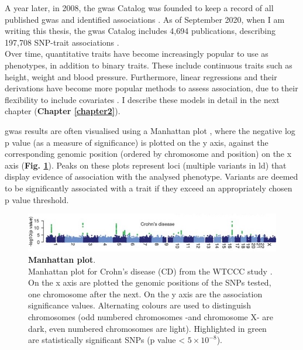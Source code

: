A year later, in 2008, the \gls{gwas} Catalog was founded to keep a record of all published \gls{gwas} and identified associations \cite{welter2014nhgri}.
As of September 2020, when I am writing this thesis, the \gls{gwas} Catalog includes 4,694 publications, describing 197,708 SNP-trait associations \cite{macarthur2017new}.\\

Over time, quantitative traits have become increasingly popular to use as phenotypes, in addition to binary traits.
These include continuous traits such as height, weight and blood pressure.
Furthermore, linear regressions and their derivations have become more popular methods to assess association, due to their flexibility to include covariates \cite{mccarthy2008genome}.
I describe these models in detail in the next chapter (\textbf{Chapter \ref{chapter2}}). 

\newpage

\gls{gwas} results are often visualised using a Manhattan plot \cite{mccarthy2008genome}, where the negative log p value (as a measure of significance) is plotted on the y axis, against the corresponding genomic position (ordered by chromosome and position) on the x axis (\textbf{Fig. \ref{fig:manhattan}}). 
Peaks on these plots represent loci (multiple variants in \gls{ld}) that display evidence of association with the analysed phenotype. 
Variants are deemed to be significantly associated with a trait if they exceed an appropriately chosen p value threshold. 

\begin{figure}[h]
\centering
\includegraphics[width=15cm]{Chapter1/Fig/Manhattan_plots_CD_WTCCC_2007.jpg}
\caption[Manhattan plot]{\textbf{Manhattan plot}.\\
Manhattan plot for Crohn's disease (CD) from the WTCCC study \cite{wellcome2007genome}.
On the x axis are plotted the genomic positions of the SNPs tested, one chromosome after the next.
On the y axis are the association significance values.  
Alternating colours are used to distinguish chromosomes (odd numbered chromosomes -and chromosome X- are dark, even numbered chromosomes are light).
Highlighted in green are statistically significant SNPs (p value < $5 \times 10^{-8}$).}
\label{fig:manhattan}
\end{figure}

